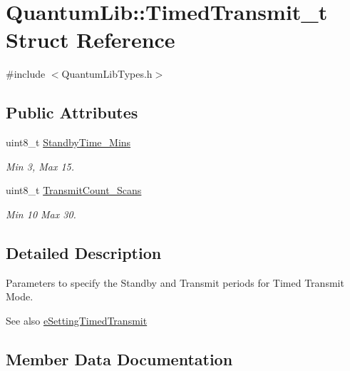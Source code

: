 \hypertarget{struct_quantum_lib_1_1_timed_transmit__t}{}\section{Quantum\+Lib\+:\+:Timed\+Transmit\+\_\+t Struct Reference}
\label{struct_quantum_lib_1_1_timed_transmit__t}


{\ttfamily \#include $<$Quantum\+Lib\+Types.\+h$>$}

\subsection*{Public Attributes}
\begin{DoxyCompactItemize}
\item 
uint8\+\_\+t \mbox{\hyperlink{struct_quantum_lib_1_1_timed_transmit__t_adbb57e7b2e37781cf3e86c33dec74173}{Standby\+Time\+\_\+\+Mins}}
\begin{DoxyCompactList}\small\item\em Min 3, Max 15. \end{DoxyCompactList}\item 
uint8\+\_\+t \mbox{\hyperlink{struct_quantum_lib_1_1_timed_transmit__t_a3ee8c45d36a8f1ea0c6433b294f1ca0e}{Transmit\+Count\+\_\+\+Scans}}
\begin{DoxyCompactList}\small\item\em Min 10 Max 30. \end{DoxyCompactList}\end{DoxyCompactItemize}


\subsection{Detailed Description}
Parameters to specify the Standby and Transmit periods for Timed Transmit Mode. \begin{DoxySeeAlso}{See also}
\mbox{\hyperlink{namespace_quantum_lib_acc8124e3e65bca4aa798d03a55e3d54caab7ab78364b884006412b502e7d09572}{e\+Setting\+Timed\+Transmit}} 
\end{DoxySeeAlso}


\subsection{Member Data Documentation}
\mbox{\label{struct_quantum_lib_1_1_timed_transmit__t_adbb57e7b2e37781cf3e86c33dec74173}} 
